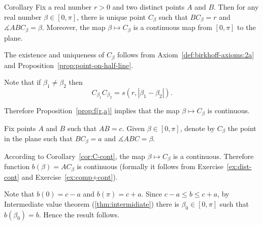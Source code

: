 \begin{thm}{Corollary}\label{cor:C-cont}
Fix a real number $r>0$ 
and two distinct points $A$ and $B$.
Then for 
any real number $\beta\in [0,\pi]$,
there is unique point $C_\beta$ such that $BC_\beta=r$
and $\measuredangle ABC_\beta=\beta$.
Moreover, the map $\beta\mapsto C_\beta$ 
is a continuous map from $[0,\pi]$ to the plane.
\end{thm}

The existence and uniqueness of $C_\beta$ follows from Axiom~\ref{def:birkhoff-axioms:2a} and Proposition~\ref{prop:point-on-half-line}.

Note that if $\beta_1\ne\beta_2$ then
$$C_{\beta_1}C_{\beta_2}=s(r,|\beta_1-\beta_2|).$$

Therefore Proposition~\ref{prop:f(r,a)} implies that  the map $\beta\mapsto C_\beta$ is continuous.
\qeds





Fix points $A$ and $B$ such that $AB=c$.
Given $\beta\in [0,\pi]$,
denote by $C_\beta$ the point in the plane such that $BC_\beta=a$ and $\measuredangle ABC=\beta$.

According to Corollary~\ref{cor:C-cont},
the map
$\beta\mapsto C_\beta$ is a continuous.
Therefore function $b(\beta)=AC_\beta$ is continuous
(formally it follows from Exercise~\ref{ex:dist-cont} and Exercise~\ref{ex:comp+cont}).

Note that $b(0)=c-a$ and $b(\pi)=c+a$.
Since $c-a\le b\le c+a$,
by Intermediate value theorem (\ref{thm:intermidiate})
there is $\beta_0\in[0,\pi]$ such that
$b(\beta_0)=b$.
Hence the result follows. 
\qeds



